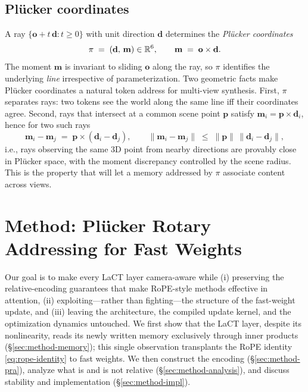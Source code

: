 \subsection{Plücker coordinates}
\label{sec:prelim-plucker}

A ray $\{\mathbf{o} + t\,\mathbf{d} : t \ge 0\}$ with unit direction
$\mathbf{d}$ determines the \emph{Plücker coordinates}
\begin{equation}
\label{eq:plucker}
\pi \;=\; (\mathbf{d},\, \mathbf{m}) \in \mathbb{R}^6,
\qquad
\mathbf{m} \;=\; \mathbf{o} \times \mathbf{d}.
\end{equation}
The moment $\mathbf{m}$ is invariant to sliding $\mathbf{o}$ along the ray,
so $\pi$ identifies the underlying \emph{line} irrespective of
parameterization. Two geometric facts make Plücker coordinates a natural
token address for multi-view synthesis. First, $\pi$ separates rays: two
tokens see the world along the same line iff their coordinates agree.
Second, rays that intersect at a common scene point $\mathbf{p}$ satisfy
$\mathbf{m}_i = \mathbf{p} \times \mathbf{d}_i$, hence for two such rays
\begin{equation}
\label{eq:moment-bound}
\mathbf{m}_i - \mathbf{m}_j \;=\; \mathbf{p} \times (\mathbf{d}_i - \mathbf{d}_j),
\qquad
\|\mathbf{m}_i - \mathbf{m}_j\| \;\le\; \|\mathbf{p}\|\, \|\mathbf{d}_i - \mathbf{d}_j\|,
\end{equation}
i.e., rays observing the same 3D point from nearby directions are provably
close in Plücker space, with the moment discrepancy controlled by the scene
radius. This is the property that will let a memory addressed by $\pi$
associate content across views.

\section{Method: Plücker Rotary Addressing for Fast Weights}
\label{sec:method}

Our goal is to make every LaCT layer camera-aware while (i) preserving the
relative-encoding guarantees that make RoPE-style methods effective in
attention, (ii) exploiting---rather than fighting---the structure of the
fast-weight update, and (iii) leaving the architecture, the compiled update
kernel, and the optimization dynamics untouched. We first show that the
LaCT layer, despite its nonlinearity, reads its newly written memory
exclusively through inner products (\S\ref{sec:method-memory}); this single
observation transplants the RoPE identity \eqref{eq:rope-identity} to fast
weights. We then construct the encoding (\S\ref{sec:method-pra}), analyze
what is and is not relative (\S\ref{sec:method-analysis}), and discuss
stability and implementation (\S\ref{sec:method-impl}).


